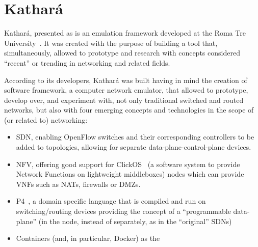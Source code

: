 \section{Kathará}
\label{sec:exemulkathara}

Kathará, presented as  is an emulation framework developed at the Roma Tre University~\cite{kathara}.
It was created with the purpose of building a tool that, simultaneously, allowed to prototype and research with concepts considered ``recent'' or trending in networking and related fields.

According to its developers, Kathará was built having in mind the creation of software framework, a computer network emulator, that allowed to prototype, develop over, and experiment with, not only traditional switched and routed networks, but also with four emerging concepts and technologies in the scope of (or related to) networking:
\begin{itemize}
	\item SDN, enabling OpenFlow switches and their corresponding controllers to be added to topologies, allowing for separate data-plane-control-plane devices.
	\item NFV, offering good support for ClickOS~\cite{clickos} (a software system to provide Network Functions on lightweight middleboxes) nodes which can provide VNFs such as NATs, firewalls or DMZs.
	\item P4~\cite{p4programming}, a domain specific language that is compiled and run on switching/routing devices providing the concept of a ``programmable data-plane'' (in the node, instead of separately, as in the ``original'' SDNs)
	\item Containers (and, in particular, Docker) as the 
\end{itemize}

